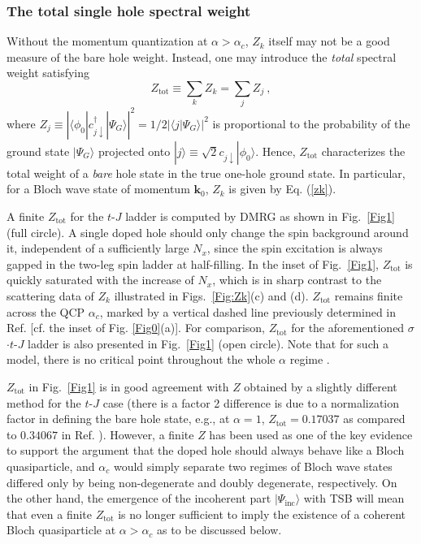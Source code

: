 \documentclass[aps,prb,twocolumn,notitlepage,superscriptaddress,showpacs]{revtex4-1}
\begin{document}

\subsubsection{The total single hole spectral weight}

Without the momentum quantization at $\alpha>\alpha_c$, $Z_k$ itself may not be a good measure of the bare hole weight. Instead, one may introduce the \emph{total} spectral weight satisfying
\begin{equation}\label{ztot}
Z_{\mathrm {tot}}\equiv \sum_k Z_k= \sum_j Z_j~,
\end{equation}
where $Z_j\equiv \left |\langle \phi_0|c^{\dagger}_{j\downarrow} |\Psi_G \rangle \right |^2=1/2\left |\langle j|\Psi_G \rangle \right |^2$ is proportional to the probability of the ground state $|\Psi_G \rangle$ projected onto $|j\rangle\equiv \sqrt{2}c_{j\downarrow} |\phi_0 \rangle $. Hence, $Z_{\mathrm {tot}}$ characterizes the total weight of a \emph{bare} hole state in the true one-hole ground state. In particular, for a Bloch wave state of momentum ${\textbf{k}}_0$, $Z_k$ is given by Eq. (\ref{zk}).

A finite $Z_{\mathrm {tot}}$ for the $t$-$J$ ladder is computed by DMRG as shown in Fig.~\ref{Fig1} (full circle). A single doped hole should only change the spin background around it, independent of a sufficiently large $N_x$, since the spin excitation is always gapped in the two-leg spin ladder at half-filling. In the inset of Fig.~\ref{Fig1}, $Z_{\mathrm {tot}} $ is quickly saturated with the increase of $N_x$, which is in sharp contrast to the scattering data of $Z_k$ illustrated in Figs.~\ref{Fig:Zk}(c) and (d). $Z_{\mathrm {tot}} $ remains finite across the QCP $\alpha_c$, marked by a vertical dashed line previously determined in Ref.  [cf. the inset of Fig. \ref{Fig0}(a)].
For comparison, $Z_{\mathrm {tot}}$ for the aforementioned $\sigma$$\cdot$$t$-$J$ ladder is also presented in Fig.~\ref{Fig1} (open circle). Note that for such a model, there is no critical point throughout the whole $\alpha$ regime \cite{ZZ2014qp}.

$Z_{\mathrm {tot}}$ in Fig.~\ref{Fig1} is in good agreement with $Z$ obtained \cite{WSK2015} by a slightly different method for the $t$-$J$ case (there is a factor 2 difference is due to a normalization factor in defining the bare hole state, e.g., at $\alpha=1$, $Z_{\mathrm {tot}}=0.17037$ as compared to $0.34067$ in Ref. ). However, a finite $Z$ has been used \cite{WSK2015} as one of the key evidence to support the argument that the doped hole should always behave like a Bloch quasiparticle, and $\alpha_c$ would simply separate two regimes of Bloch wave states differed only by being non-degenerate and doubly degenerate, respectively. On the other hand, the emergence of the incoherent part $|\Psi_{\mathrm {inc}}\rangle $ with TSB will mean that even a finite $Z_{\mathrm {tot}}$ is no longer sufficient to imply the existence of a coherent Bloch quasiparticle at $\alpha>\alpha_c$ as to be discussed below.
\end{document}
